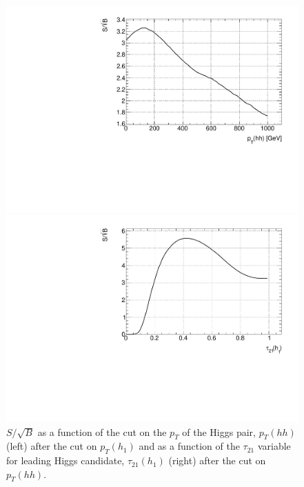 \begin{figure}
	\centering
	\begin{minipage}{.5\textwidth}
		\centering
		\includegraphics[trim={.6cm 0 0 0},clip,width=\linewidth]{./Figures/SSB_hh_pt.pdf}
	\end{minipage}%
	\begin{minipage}{.5\textwidth}
		\centering
		\includegraphics[trim={0 0 .65cm 0},clip,width=\linewidth]{./Figures/SSB_h1_tau21.pdf}
	\end{minipage}
	\label{fig:SSB_hh_pt}
	\caption{$S/\sqrt{B}$ as a function of the cut on the $p_T$ of the Higgs pair, $p_T(hh)$ (left) after the cut on $p_T(h_1)$ and as a function of the $\tau_{21}$ variable for leading Higgs candidate, $\tau_{21}(h_1)$ (right) after the cut on $p_T(hh)$.}
\end{figure} 

